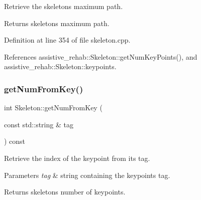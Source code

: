 Retrieve the skeleton\textquotesingle{}s maximum path. 

\begin{DoxyReturn}{Returns}
skeleton\textquotesingle{}s maximum path. 
\end{DoxyReturn}


Definition at line 354 of file skeleton.\+cpp.


\begin{DoxyCode}{0}

\end{DoxyCode}


References assistive\+\_\+rehab\+::\+Skeleton\+::get\+Num\+Key\+Points(), and assistive\+\_\+rehab\+::\+Skeleton\+::keypoints.

\mbox{\label{classassistive__rehab_1_1Skeleton_a954bfa99e0dad997ca6d93495246d3f1}} 
\subsubsection{\texorpdfstring{getNumFromKey()}{getNumFromKey()}}
{\footnotesize\ttfamily int Skeleton\+::get\+Num\+From\+Key (\begin{DoxyParamCaption}\item[{const std\+::string \&}]{tag }\end{DoxyParamCaption}) const\hspace{0.3cm}{\ttfamily [inherited]}}



Retrieve the index of the keypoint from its tag. 


\begin{DoxyParams}{Parameters}
{\em tag} & string containing the keypoint\textquotesingle{}s tag. \\
\hline
\end{DoxyParams}
\begin{DoxyReturn}{Returns}
skeleton\textquotesingle{}s number of keypoints. 
\end{DoxyReturn}


